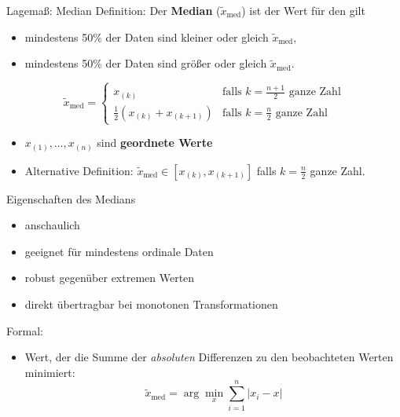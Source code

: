 \documentclass[
  10pt,
  ignorenonframetext,
]{beamer}
\providecommand{\tightlist}{%
  \setlength{\itemsep}{0pt}\setlength{\parskip}{0pt}}
\begin{document}
\begin{frame}{Lagemaß: Median}
\label{lagemauxdf-median}
Definition: Der \textbf{Median} (\(\tilde x_{\text{med}}\)) ist der Wert
für den gilt

\begin{itemize}
\tightlist
\item
  mindestens 50\% der Daten sind kleiner oder gleich
  \(\tilde x_{\text{med}}\),
\item
  mindestens 50\% der Daten sind größer oder gleich
  \(\tilde x_{\text{med}}\).
\end{itemize}

\begin{equation*}
 \tilde x_{\text{med}} = \left\{ \begin{array}{ll}
                                  x_{(k)} & \text{falls } k=\frac{n+1}{2}
\text{ ganze Zahl} \\
                                  \frac{1}{2} \left(x_{(k)} + x_{(k+1)}\right) &
\text{falls } k=\frac{n}{2} \text{ ganze Zahl}
                              \end{array}\right.
\end{equation*}

\begin{itemize}
\tightlist
\item
  \(x_{(1)},\ldots,x_{(n)}\) sind \textbf{geordnete Werte}
\item
  Alternative Definition:
  \(\tilde x_{\text{med}} \in [x_{(k)}, x_{(k+1)}]\) falls
  \(k = \frac{n}{2}\) ganze Zahl.
\end{itemize}
\end{frame}

\begin{frame}{Eigenschaften des Medians}
\label{eigenschaften-des-medians}
\begin{itemize}
\tightlist
\item
  anschaulich
\item
  geeignet für mindestens ordinale Daten
\item
  robust gegenüber extremen Werten
\item
  direkt übertragbar bei monotonen Transformationen
\end{itemize}

Formal:

\begin{itemize}
\tightlist
\item
  Wert, der die Summe der \emph{absoluten} Differenzen zu den
  beobachteten Werten minimiert:
  \[\tilde x_{\text{med}} = \arg\min_x \sum^n_{i=1} |x_i - x|\]
\end{itemize}
\end{frame}
\end{document}
